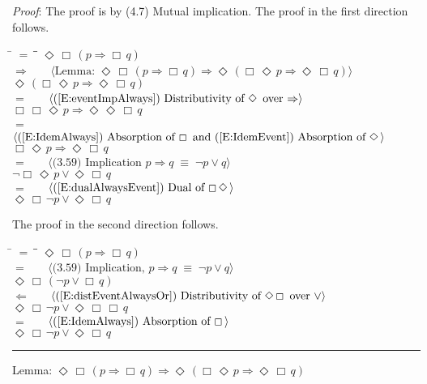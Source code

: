 \documentclass[12pt, fleqn, leqno]{article}
\newcommand{\lgap}{2pt}                             %
\newcommand{\mymathindent}{24pt}                    %
\newcommand{\equivs}{\ensuremath{\;\equiv\;}}       %
\newcommand{\impl}{\ensuremath{\Rightarrow}}        %
\newcommand{\foll}{\ensuremath{\Leftarrow}}         %
\newcommand{\Event}{\Diamond\,}
\newcommand{\Always}{\Box\,}
\newcommand{\myqed}{\rule[-.23ex]{1.2ex}{2.0ex}}
\newcommand{\myqedtab}{\hspace{384pt}}              %
\newcommand{\Gll} {\langle}                         %
\newcommand{\Ggg} {\rangle}                         %
\newcommand{\Hint}[1]     {\ \ \ $\Gll              \mbox{#1} \Ggg$ }   %
\begin{document}
\emph{Proof}: The proof is by (4.7) Mutual implication.
The proof in the first direction follows.
\begin{tabbing}
\hspace{\mymathindent} \= $= \;$ \= \myqedtab \= \kill
  \> \>   $\Event\Always(p\impl \Always q)$\\[\lgap]
  \> $\impl$  \>  \Hint{Lemma: $\Event\Always(p\impl \Always q) \impl \Event(\Always\Event p\impl \Event\Always q)$}\\[\lgap]
  \> \>   $\Event(\Always\Event p\impl \Event\Always q)$\\[\lgap]
  \> $=$  \>  \Hint{(\ref{E:eventImpAlways}) Distributivity of $\Event$ over $\impl$}\\[\lgap]
  \> \>   $\Always\Always\Event p\impl \Event\Event\Always q$\\[\lgap]
  \> $=$  \>  \Hint{(\ref{E:IdemAlways}) Absorption of $\Always$ and (\ref{E:IdemEvent}) Absorption of $\Event$}\\[\lgap]
  \> \>   $\Always\Event p\impl \Event\Always q$\\[\lgap]
  \> $=$  \>  \Hint{(3.59) Implication $p\impl q \equivs \neg p \lor q$}\\[\lgap]
  \> \>   $\neg\Always\Event p\lor \Event\Always q$\\[\lgap]
  \> $=$  \>  \Hint{(\ref{E:dualAlwaysEvent}) Dual of $\Always \Event$}\\[\lgap]
  \> \>   $\Event\Always\neg p\lor \Event\Always q$
\end{tabbing}
The proof in the second direction follows.
\begin{tabbing}
\hspace{\mymathindent} \= $= \;$ \= \myqedtab \= \kill
  \> \>   $\Event\Always(p\impl \Always q)$\\[\lgap]
  \> $=$  \>  \Hint{(3.59) Implication, $p\impl q \equivs \neg p \lor q$}\\[\lgap]
  \> \>   $\Event\Always(\neg p\lor \Always q)$\\[\lgap]
  \> $\foll$  \>  \Hint{(\ref{E:distEventAlwaysOr}) Distributivity of $\Event\Always$ over $\lor$}\\[\lgap]
  \> \>   $\Event\Always\neg p\lor \Event\Always\Always q$\\[\lgap]  
  \> $=$  \>  \Hint{(\ref{E:IdemAlways}) Absorption of $\Always$}\\[\lgap]
  \> \>   $\Event\Always\neg p\lor \Event\Always q$ \quad \myqed
\end{tabbing}
Lemma: $\Event\Always(p\impl \Always q) \impl \Event(\Always\Event p\impl \Event\Always q)$
\end{document}

